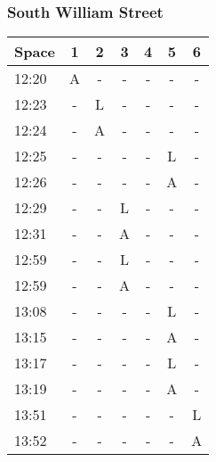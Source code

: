 \subsubsection*{South William Street}
\begin{tabularx}{\textwidth}{|X|c|c|c|c|c|c|}
    \hline
    Space & 1 & 2 & 3 & 4 & 5 & 6 \\
    \hline
    12:20 & A & - & - & - & - & - \\ \hline
    12:23 & - & L & - & - & - & - \\ \hline
    12:24 & - & A & - & - & - & - \\ \hline
    12:25 & - & - & - & - & L & - \\ \hline
    12:26 & - & - & - & - & A & - \\ \hline
    12:29 & - & - & L & - & - & - \\ \hline
    12:31 & - & - & A & - & - & - \\ \hline
    12:59 & - & - & L & - & - & - \\ \hline
    12:59 & - & - & A & - & - & - \\ \hline
    13:08 & - & - & - & - & L & - \\ \hline
    13:15 & - & - & - & - & A & - \\ \hline
    13:17 & - & - & - & - & L & - \\ \hline
    13:19 & - & - & - & - & A & - \\ \hline
    13:51 & - & - & - & - & - & L \\ \hline
    13:52 & - & - & - & - & - & A \\
    \hline
\end{tabularx}